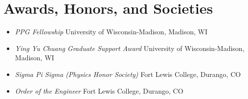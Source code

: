 \section{Awards, Honors, and Societies}

\begin{itemize}
    \item \textit{PPG Fellowship} \hfill University of Wisconsin-Madison, Madison, WI
    \item \textit{Ying Yu Chuang Graduate Support Award} \hfill University of Wisconsin-Madison, Madison, WI
    \item \textit{Sigma Pi Sigma (Physics Honor Society)} \hfill Fort Lewis College, Durango, CO
    \item \textit{Order of the Engineer} \hfill Fort Lewis College, Durango, CO
\end{itemize}
